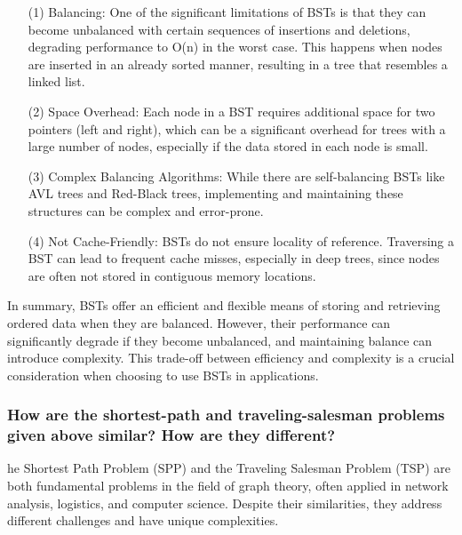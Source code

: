 \begin{enumerate}[leftmargin=2em]
\item[(1)] Balancing: One of the significant limitations of BSTs is that they can become unbalanced with certain sequences of insertions and deletions, degrading performance to O(n) in the worst case. This happens when nodes are inserted in an already sorted manner, resulting in a tree that resembles a linked list.

\item[(2)] Space Overhead: Each node in a BST requires additional space for two pointers (left and right), which can be a significant overhead for trees with a large number of nodes, especially if the data stored in each node is small.

\item[(3)] Complex Balancing Algorithms: While there are self-balancing BSTs like AVL trees and Red-Black trees, implementing and maintaining these structures can be complex and error-prone.

\item[(4)] Not Cache-Friendly: BSTs do not ensure locality of reference. Traversing a BST can lead to frequent cache misses, especially in deep trees, since nodes are often not stored in contiguous memory locations.
\end{enumerate}
In summary, BSTs offer an efficient and flexible means of storing and retrieving ordered data when they are balanced. However, their performance can significantly degrade if they become unbalanced, and maintaining balance can introduce complexity. This trade-off between efficiency and complexity is a crucial consideration when choosing to use BSTs in applications.

\subsubsection{How are the shortest-path and traveling-salesman problems given above similar? How are they different?}

he Shortest Path Problem (SPP) and the Traveling Salesman Problem (TSP) are both fundamental problems in the field of graph theory, often applied in network analysis, logistics, and computer science. Despite their similarities, they address different challenges and have unique complexities.

